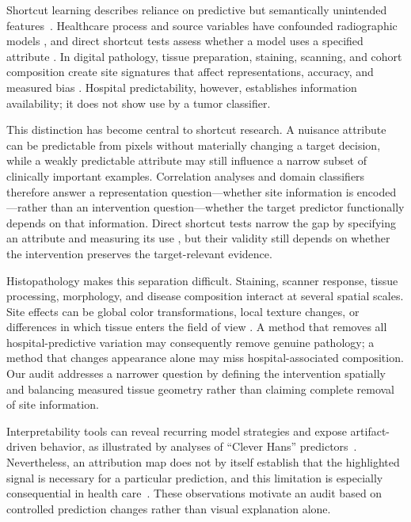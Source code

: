 \documentclass[notspecified,article,submit,moreauthors]{Definitions/mdpi}
\begin{document}
Shortcut learning describes reliance on predictive but semantically
unintended features~\cite{geirhos2020shortcut}. Healthcare process and
source variables have confounded radiographic models
\cite{zech2018variable,badgeley2019confounding,degrave2021shortcuts}, and
direct shortcut tests assess whether a model uses a specified attribute
\cite{brown2023shortcut}. In digital pathology, tissue preparation,
staining, scanning, and cohort composition create site signatures that
affect representations, accuracy, and measured bias
\cite{howard2021site,stacke2021domain,bidgoli2022bias,tellez2019stain,
aubreville2023midog,komen2026robust}.
Hospital predictability, however, establishes information availability;
it does not show use by a tumor classifier.

This distinction has become central to shortcut research. A nuisance
attribute can be predictable from pixels without materially changing a target
decision, while a weakly predictable attribute may still influence a narrow
subset of clinically important examples. Correlation analyses and domain
classifiers therefore answer a representation question---whether site
information is encoded---rather than an intervention question---whether the
target predictor functionally depends on that information. Direct shortcut
tests narrow the gap by specifying an attribute and measuring its use
\cite{brown2023shortcut}, but their validity still depends on whether the
intervention preserves the target-relevant evidence.

Histopathology makes this separation difficult. Staining, scanner response,
tissue processing, morphology, and disease composition interact at several
spatial scales. Site effects can be global color transformations, local
texture changes, or differences in which tissue enters the field of view
\cite{stacke2021domain,howard2021site,bidgoli2022bias}. A method that removes
all hospital-predictive variation may consequently remove genuine pathology;
a method that changes appearance alone may miss hospital-associated
composition. Our audit addresses a narrower question by defining the
intervention spatially and balancing measured tissue geometry rather than
claiming complete removal of site information.

Interpretability tools can reveal recurring model strategies and expose
artifact-driven behavior, as illustrated by analyses of ``Clever Hans''
predictors~\cite{lapuschkin2019cleverhans}. Nevertheless, an attribution map
does not by itself establish that the highlighted signal is necessary for a
particular prediction, and this limitation is especially consequential in
health care~\cite{ghassemi2021falsehope}. These observations motivate an audit
based on controlled prediction changes rather than visual explanation alone.
\end{document}

